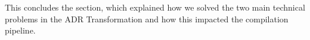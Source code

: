 This concludes the section, which explained how we solved the two main technical problems in the ADR Transformation and how this impacted the compilation pipeline.




%



